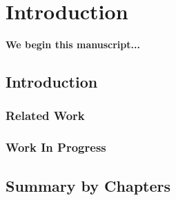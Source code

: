 
\chapter{Introduction} %
\label{Chapter1}

{\bf \small{
We begin this manuscript...
}}


\section{Introduction}





\subsection*{Related Work}



\subsection*{Work In Progress}


\section{Summary by Chapters}\label{sumchap}

